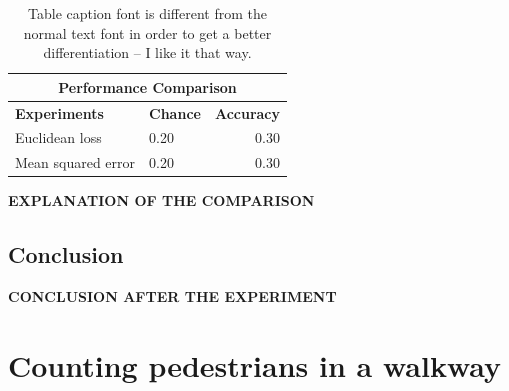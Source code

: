 \begin{table}[H]
\caption{Table caption font is different from the normal text font in order to get a better differentiation -- I like it that way.}
\centering
\small\sffamily
\begin{tabular}{llr}
\multicolumn{3}{c}{\textbf{\textbf{Performance Comparison}}} \\
\bottomrule
\textbf{Experiments}  & \textbf{Chance} & \textbf{Accuracy} \\
\bottomrule
Euclidean loss           & 0.20 & 0.30 \\
Mean squared error       & 0.20 & 0.30 \\

\bottomrule
\end{tabular}
\end{table} 

\textbf{EXPLANATION OF THE COMPARISON}

\subsection{Conclusion}

\textbf{CONCLUSION AFTER THE EXPERIMENT} 

\section{Counting pedestrians in a walkway}

